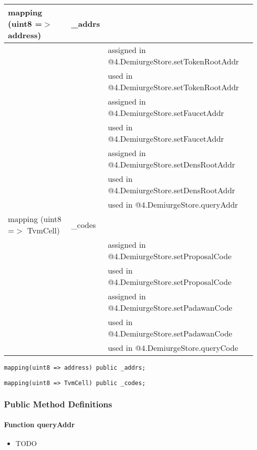 \ifsoltables
\noindent\begin{tabular}{|l|l|p{5cm}|}\hline
mapping (uint8 =$>$ address) & \_{}addrs &  \\\hline
 & & assigned in @4.DemiurgeStore.setTokenRootAddr\\\hline
 & & used in @4.DemiurgeStore.setTokenRootAddr\\\hline
 & & assigned in @4.DemiurgeStore.setFaucetAddr\\\hline
 & & used in @4.DemiurgeStore.setFaucetAddr\\\hline
 & & assigned in @4.DemiurgeStore.setDensRootAddr\\\hline
 & & used in @4.DemiurgeStore.setDensRootAddr\\\hline
 & & used in @4.DemiurgeStore.queryAddr\\\hline
mapping (uint8 =$>$ TvmCell) & \_{}codes &  \\\hline
 & & assigned in @4.DemiurgeStore.setProposalCode\\\hline
 & & used in @4.DemiurgeStore.setProposalCode\\\hline
 & & assigned in @4.DemiurgeStore.setPadawanCode\\\hline
 & & used in @4.DemiurgeStore.setPadawanCode\\\hline
 & & used in @4.DemiurgeStore.queryCode\\\hline
\end{tabular}
\fi


\begin{lstlisting}[firstnumber=11]
    mapping(uint8 => address) public _addrs;
\end{lstlisting}

\begin{lstlisting}[firstnumber=12]
    mapping(uint8 => TvmCell) public _codes;
\end{lstlisting}

\subsubsection{Public Method Definitions}


\paragraph{Function queryAddr}

\begin{itemize}
\item TODO
\end{itemize}

